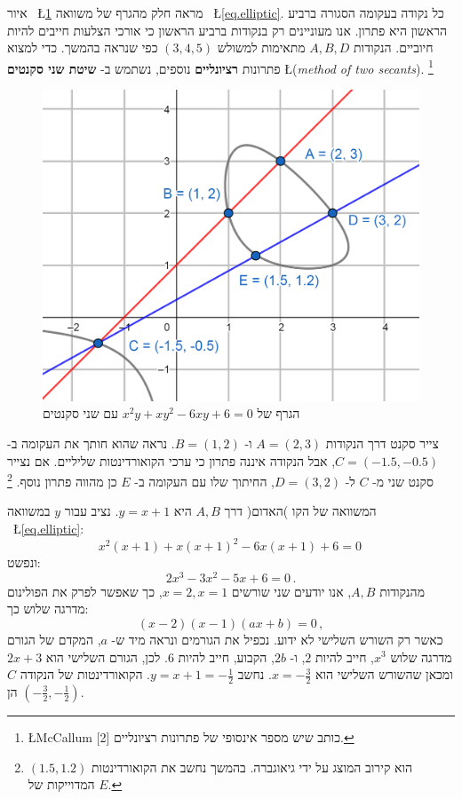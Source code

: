 \documentclass[12pt,a4paper]{article}
\begin{document}
איור%
~\L{\ref{fig.elliptic}}
מראה חלק מהגרף של משוואה%
~\L{\ref{eq.elliptic}}.
כל נקודה בעקומה הסגורה ברביע הראשון היא פתרון. אנו מעוניינים רק בנקודות ברביע הראשון כי אורכי הצלעות חייבים להיות חיוביים. הנקודות 
$A,B,D$
מתאימות למשולש
$(3,4,5)$
כפי שנראה בהמשך. כדי למצוא פתרונות 
\textbf{רציונליים}
נוספים, נשתמש ב-%
\textbf{שיטת שני סקנטים}
\L{(\textit{method of two secants})}.%
\footnote{\L{McCallum [2]}
כותב שיש מספר אינסופי של פתרונות רציונליים.}
\begin{figure}[H]
\begin{center}
\includegraphics[width=.7\textwidth]{elliptic1}
\end{center}
\caption{%
הגרף של
$x^2y + xy^2 -6xy + 6 = 0$
עם שני סקנטים}%
\label{fig.elliptic}
\end{figure}

\vspace*{-4ex}
צייר סקנט דרך הנקודות
$A=(2,3)$
ו-%
$B=(1,2)$.
נראה שהוא חותך את העקומה ב-%
$C=(-1.5,-0.5)$,
אבל הנקודה איננה פתרון כי ערכי הקואורדינטות שליליים. אם נצייר סקנט שני מ-%
$C$
ל-%
$D=(3,2)$,
החיתוך שלו עם העקומה ב-%
$E$
כן מהווה פתרון נוסף.%
\footnote{$(1.5,1.2)$
הוא קירוב המוצג על ידי גיאוגברה. בהמשך נחשב את הקואורדינטות המדוייקות של
$E$.}

המשוואה של הקו )האדום( דרך 
$A,B$
היא
$y=x+1$. 
נציב עבור 
$y$
במשוואה%
~\L{\ref{eq.elliptic}}:
\[
x^2(x+1) + x(x+1)^2 -6x(x+1) +6 =0\,
\]
ונפשט:
\[
2x^3 -3x^2 -5x +6 =0\,.
\]
מהנקודות
$A,B$,
אנו יודעים שני שורשים
$x=2,x=1$,
כך שאפשר לפרק את הפולינום מדרגה שלוש כך:
\[
(x-2)(x-1)(ax+b)=0\,,
\]
כאשר רק השורש השלישי לא ידוע. נכפיל את הגורמים ונראה מיד ש-%
$a$,
המקדם של הגורם מדרגה שלוש
$x^3$,
חייב להיות
$2$,
ו-%
$2b$,
הקבוע, חייב להיות
$6$.
לכן, הגורם השלישי הוא
$2x+3$
ומכאן שהשורש השלישי הוא
$x=-\frac{3}{2}$.
נחשב
$y=x+1=-\frac{1}{2}$.
הקואורדינטות של הנקודה
$C$
הן
$(-\frac{3}{2},-\frac{1}{2})$.
\end{document}
